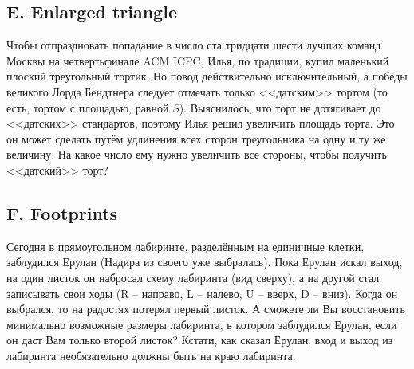 


\subsection*{E. Enlarged triangle}

Чтобы отпраздновать попадание в число ста тридцати шести лучших команд Москвы на четвертьфинале ACM ICPC, Илья, по традиции, купил маленький плоский треугольный тортик. Но повод действительно исключительный, а победы великого Лорда Бендтнера следует отмечать только <<датским>> тортом (то есть, тортом с площадью, равной $S$). Выяснилось, что торт не дотягивает до <<датских>> стандартов, поэтому Илья решил увеличить площадь торта. Это он может сделать путём удлинения всех сторон треугольника на одну и ту же величину. На какое число ему нужно увеличить все стороны, чтобы получить <<датский>> торт?







\subsection*{F. Footprints}

Сегодня в прямоугольном лабиринте, разделённым на единичные клетки, заблудился Ерулан (Надира из своего уже выбралась). Пока Ерулан искал выход, на один листок он набросал схему лабиринта (вид сверху), а на другой стал записывать свои ходы (R – направо, L – налево, U – вверх, D – вниз). Когда он выбрался, то на радостях потерял первый листок. А сможете ли Вы восстановить минимально возможные размеры лабиринта, в котором заблудился Ерулан, если он даст Вам только второй листок? Кстати, как сказал Ерулан, вход и выход из лабиринта необязательно должны быть на краю лабиринта.


